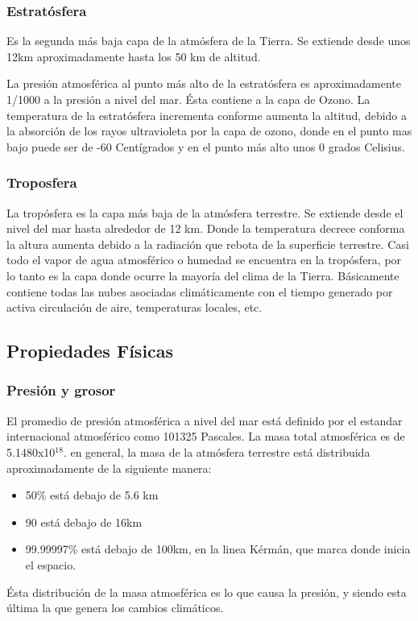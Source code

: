 \documentclass{article}
\begin{document}
\subsubsection{Estratósfera}
Es la segunda más baja capa de la atmósfera de la Tierra. Se extiende desde unos 12km aproximadamente hasta los 50 km de altitud.

La presión atmosférica al punto más alto de la estratósfera es aproximadamente 1/1000 a la presión a nivel del mar. Ésta contiene a la capa de Ozono. La temperatura de la estratósfera incrementa conforme aumenta la altitud, debido a la absorción de los rayos ultravioleta por la capa de ozono, donde en el punto mas bajo puede ser de -60 Centígrados y en el punto más alto unos 0 grados Celisius.

\subsubsection{Troposfera}
La tropósfera es la capa más baja de la atmósfera terrestre. Se extiende desde el nivel del mar hasta alrededor de 12 km. Donde la temperatura decrece conforma la altura aumenta debido a la radiación que rebota de la superficie terrestre.
Casi todo el vapor de agua atmosférico o humedad se encuentra en la tropósfera, por lo tanto es la capa donde ocurre la mayoría del clima de la Tierra. Básicamente contiene todas las nubes asociadas climáticamente con el tiempo generado por activa circulación de aire, temperaturas locales, etc.

\subsection{Propiedades Físicas}

\subsubsection{Presión y grosor}
El promedio de presión atmosférica a nivel del mar está definido por el estandar internacional atmosférico como 101325 Pascales. La masa total atmosférica es de 5.1480x10$^18$.
en general, la masa de la atmósfera terrestre está distribuida aproximadamente de la siguiente manera:
\begin{itemize}
    \item 50\% está debajo de 5.6 km
    \item 90 está debajo de 16km
    \item 99.99997\% está debajo de 100km, en la linea Kérmán, que marca donde inicia el espacio.
 \end{itemize}
Ésta distribución de la masa atmosférica es lo que causa la presión, y siendo esta última la que genera los cambios climáticos.
\end{document}
